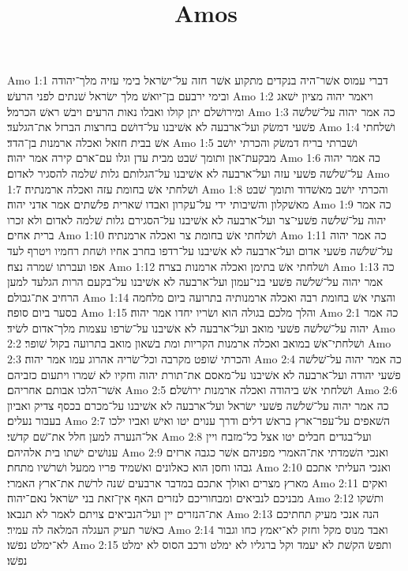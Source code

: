 

\title{Amos}

Amo 1:1  דברי עמוס אשׁר־היה בנקדים מתקוע אשׁר חזה על־ישׂראל בימי עזיה מלך־יהודה ובימי ירבעם בן־יואשׁ מלך ישׂראל שׁנתים לפני הרעשׁ׃
Amo 1:2  ויאמר יהוה מציון ישׁאג ומירושׁלם יתן קולו ואבלו נאות הרעים ויבשׁ ראשׁ הכרמל׃
Amo 1:3  כה אמר יהוה על־שׁלשׁה פשׁעי דמשׂק ועל־ארבעה לא אשׁיבנו על־דושׁם בחרצות הברזל את־הגלעד׃
Amo 1:4  ושׁלחתי אשׁ בבית חזאל ואכלה ארמנות בן־הדד׃
Amo 1:5  ושׁברתי בריח דמשׂק והכרתי יושׁב מבקעת־און ותומך שׁבט מבית עדן וגלו עם־ארם קירה אמר יהוה׃
Amo 1:6  כה אמר יהוה על־שׁלשׁה פשׁעי עזה ועל־ארבעה לא אשׁיבנו על־הגלותם גלות שׁלמה להסגיר לאדום׃
Amo 1:7  ושׁלחתי אשׁ בחומת עזה ואכלה ארמנתיה׃
Amo 1:8  והכרתי יושׁב מאשׁדוד ותומך שׁבט מאשׁקלון והשׁיבותי ידי על־עקרון ואבדו שׁארית פלשׁתים אמר אדני יהוה׃
Amo 1:9  כה אמר יהוה על־שׁלשׁה פשׁעי־צר ועל־ארבעה לא אשׁיבנו על־הסגירם גלות שׁלמה לאדום ולא זכרו ברית אחים׃
Amo 1:10  ושׁלחתי אשׁ בחומת צר ואכלה ארמנתיה׃
Amo 1:11  כה אמר יהוה על־שׁלשׁה פשׁעי אדום ועל־ארבעה לא אשׁיבנו על־רדפו בחרב אחיו ושׁחת רחמיו ויטרף לעד אפו ועברתו שׁמרה נצח׃
Amo 1:12  ושׁלחתי אשׁ בתימן ואכלה ארמנות בצרה׃
Amo 1:13  כה אמר יהוה על־שׁלשׁה פשׁעי בני־עמון ועל־ארבעה לא אשׁיבנו על־בקעם הרות הגלעד למען הרחיב את־גבולם׃
Amo 1:14  והצתי אשׁ בחומת רבה ואכלה ארמנותיה בתרועה ביום מלחמה בסער ביום סופה׃
Amo 1:15  והלך מלכם בגולה הוא ושׂריו יחדו אמר יהוה׃
Amo 2:1  כה אמר יהוה על־שׁלשׁה פשׁעי מואב ועל־ארבעה לא אשׁיבנו על־שׂרפו עצמות מלך־אדום לשׂיד׃
Amo 2:2  ושׁלחתי־אשׁ במואב ואכלה ארמנות הקריות ומת בשׁאון מואב בתרועה בקול שׁופר׃
Amo 2:3  והכרתי שׁופט מקרבה וכל־שׂריה אהרוג עמו אמר יהוה׃
Amo 2:4  כה אמר יהוה על־שׁלשׁה פשׁעי יהודה ועל־ארבעה לא אשׁיבנו על־מאסם את־תורת יהוה וחקיו לא שׁמרו ויתעום כזביהם אשׁר־הלכו אבותם אחריהם׃
Amo 2:5  ושׁלחתי אשׁ ביהודה ואכלה ארמנות ירושׁלם׃
Amo 2:6  כה אמר יהוה על־שׁלשׁה פשׁעי ישׂראל ועל־ארבעה לא אשׁיבנו על־מכרם בכסף צדיק ואביון בעבור נעלים׃
Amo 2:7  השׁאפים על־עפר־ארץ בראשׁ דלים ודרך ענוים יטו ואישׁ ואביו ילכו אל־הנערה למען חלל את־שׁם קדשׁי׃
Amo 2:8  ועל־בגדים חבלים יטו אצל כל־מזבח ויין ענושׁים ישׁתו בית אלהיהם׃
Amo 2:9  ואנכי השׁמדתי את־האמרי מפניהם אשׁר כגבה ארזים גבהו וחסן הוא כאלונים ואשׁמיד פריו ממעל ושׁרשׁיו מתחת׃
Amo 2:10  ואנכי העליתי אתכם מארץ מצרים ואולך אתכם במדבר ארבעים שׁנה לרשׁת את־ארץ האמרי׃
Amo 2:11  ואקים מבניכם לנביאים ומבחוריכם לנזרים האף אין־זאת בני ישׂראל נאם־יהוה׃
Amo 2:12  ותשׁקו את־הנזרים יין ועל־הנביאים צויתם לאמר לא תנבאו׃
Amo 2:13  הנה אנכי מעיק תחתיכם כאשׁר תעיק העגלה המלאה לה עמיר׃
Amo 2:14  ואבד מנוס מקל וחזק לא־יאמץ כחו וגבור לא־ימלט נפשׁו׃
Amo 2:15  ותפשׂ הקשׁת לא יעמד וקל ברגליו לא ימלט ורכב הסוס לא ימלט נפשׁו׃
